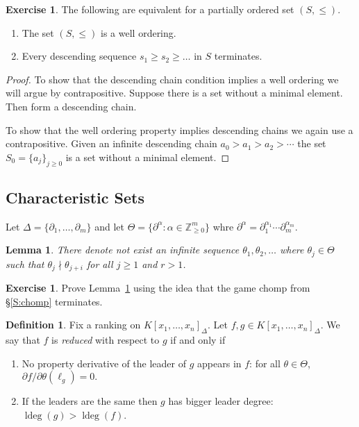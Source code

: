 \documentclass[12pt]{book}
\numberwithin{equation}{section}
\newtheorem{lemma}[theorem]{Lemma}
\theoremstyle{definition}
\newtheorem{definition}[theorem]{Definition}
\newtheorem{exercise}[theorem]{Exercise}
\theoremstyle{remark}
\newcommand{\ZZ}{\mathbb{Z}}
\newcommand{\ldeg}{\operatorname{ldeg}}
\begin{document}
\begin{exercise}
	The following are equivalent for a partially ordered set $(S,\leq)$.
	\begin{enumerate}[topsep=0pt]
	\item \label{I:well-order} The set $(S,\leq)$ is a well ordering.
	\item \label{I:dcc} Every descending sequence $s_1\geq s_2 \geq \ldots$ in $S$ terminates. 
	\end{enumerate}
\end{exercise}
\begin{proof}
	To show that the descending chain condition implies a well ordering we will argue by contrapositive. 
	Suppose there is a set without a minimal element. 
	Then form a descending chain. 
	
	To show that the well ordering property implies descending chains we again use a contrapositive. 
	Given an infinite descending chain $a_0>a_1>a_2 >\cdots$ the set $S_0 = \lbrace a_j \rbrace_{j \geq 0}$ is a set without a minimal element. 
\end{proof}

\subsection{Characteristic Sets}
Let $\Delta = \lbrace \partial_1,\ldots,\partial_m\rbrace$ and let $\Theta = \lbrace \partial^{\alpha} \colon \alpha \in \ZZ_{\geq 0}^m\rbrace$ whre $\partial^{\alpha} = \partial_1^{\alpha_1} \cdots \partial_m^{\alpha_m}$. 

\begin{lemma}\label{L:dickson}
	There denote not exist an infinite sequence $\theta_1,\theta_2,\ldots$ where $\theta_j \in \Theta$ such that $\theta_j \nmid \theta_{j+i}$ for all $j\geq 1$ and $r>1$. 
\end{lemma}

\begin{exercise}
	Prove Lemma~\ref{L:dickson} using the idea that the game chomp from \S\ref{S:chomp} terminates. 
\end{exercise}

\begin{definition}
Fix a ranking on $K[x_1,\ldots,x_n]_{\Delta}$. 
Let $f,g \in K[x_1,\ldots,x_n]_{\Delta}$.
We say that $f$ is \emph{reduced} with respect to $g$ if and only if 
\begin{enumerate}[topsep=0pt]
	\item No property derivative of the leader of $g$ appears in $f$: for all $\theta \in \Theta$, $\partial f/\partial \theta(\ell_g) =0.$
	\item If the leaders are the same then $g$ has bigger leader degree: $\ldeg(g) > \ldeg(f)$.
\end{enumerate}
\end{definition}
\end{document}
